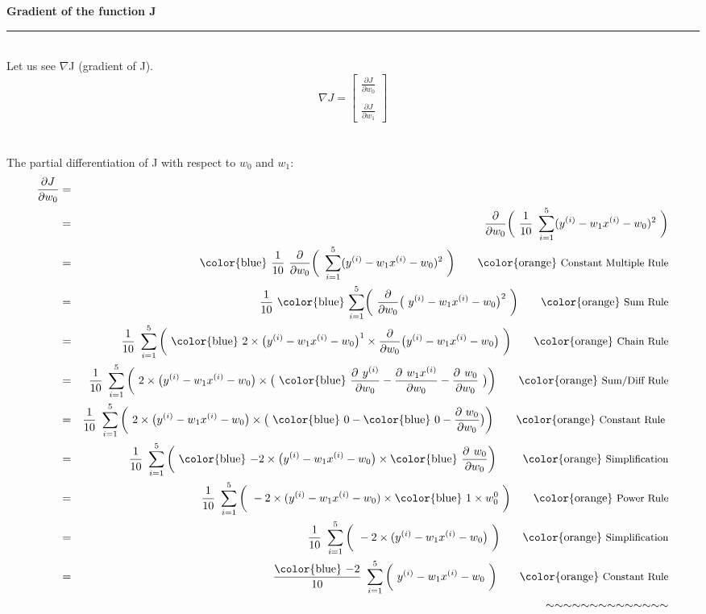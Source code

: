 \documentclass[12pt]{article}
\newcommand{\afmod}[1]{\text{{\color{blue} \textbf{$#1$}}}}
\newcommand{\qtext}[1]{\qquad \text{{\color{orange} \small{#1}}}}
\begin{document}
\break
{\Large \textbf{Gradient of the function J}} \\
\rule{\textwidth}{1pt}
\vspace{3mm} \\
\noindent Let us see $\nabla$J (gradient of J).
\[
\nabla J =
\begin{bmatrix}
    \frac{\partial J}{\partial w_0} \\
\\
    \frac{\partial J}{\partial w_1} 
\end{bmatrix}
\] \\
\vspace{5mm} \\
\noindent The partial differentiation of J with respect to $w_0$ and $w_1$:\\
\begin{eqnarray*}
\frac{\partial J}{\partial w_0} & = &  \\
& = & \frac{\partial}{\partial w_0} \bigg(\ \frac{1}{10} \ \sum_{i=1}^{5} (y^{(i)} - w_1x^{(i)} - w_0)^2\ \bigg) \\
& = & \afmod{\frac{1}{10}} \ \frac{\partial}{\partial w_0} \bigg(\  \sum_{i=1}^{5} (y^{(i)} - w_1x^{(i)} - w_0)^2\ \bigg)
 \qtext{Constant Multiple Rule} \\
& = & \frac{1}{10} \ \afmod{\sum_{i=1}^{5}} \bigg(\ \frac{\partial}{\partial w_0} \big(\ y^{(i)} - w_1x^{(i)} - w_0\big)^2\ \bigg) \qtext{Sum Rule} \\
& = & \frac{1}{10} \ \sum_{i=1}^{5} \bigg(\ \afmod{2 \times \big(y^{(i)} - w_1x^{(i)} - w_0 \big)^1 \times \frac{\partial}{\partial w_0} \big(y^{(i)} - w_1x^{(i)} - w_0 \big)}\ \bigg) \qtext{Chain Rule} \\
& = & \frac{1}{10} \ \sum_{i=1}^{5} \bigg(\ 2 \times \big(y^{(i)}-w_1x^{(i)}-w_0 \big) \times \big(\ \afmod{\frac{\partial\ y^{(i)}}{\partial w_0} - \frac{\partial\ w_1x^{(i)}}{\partial w_0} - \frac{\partial\ w_0}{\partial w_0}} \ \big) \bigg) \qtext{Sum/Diff Rule} \\
& = & \frac{1}{10} \ \sum_{i=1}^{5} \bigg(\ 2 \times \big(y^{(i)} - w_1x^{(i)} - w_0 \big) \times \big(\ \afmod{0} - \afmod{0} - \frac{\partial \ w_0}{\partial w_0} \big) \bigg) \qtext{Constant Rule } \\
& = & \frac{1}{10} \ \sum_{i=1}^{5} \bigg(\ \afmod{-}2 \times \big( y^{(i)} - w_1x^{(i)} - w_0 \big) \times \afmod{\frac{\partial\ w_0}{\partial w_0}}\bigg)\ \qtext{Simplification} \\
& = & \frac{1}{10} \ \sum_{i=1}^{5} \bigg(\ -2 \times (y^{(i)} - w_1x^{(i)} - w_0) \times \afmod{1 \times w_0^0} \ \bigg) \qtext{Power Rule} \\
& = & \frac{1}{10} \ \sum_{i=1}^{5} \bigg(\ -2 \times (y^{(i)} - w_1x^{(i)} - w_0 \big) \ \bigg) \qtext{Simplification} \\
& = & \frac{\afmod{-2}}{10} \ \sum_{i=1}^{5} \bigg( \ y^{(i)} - w_1x^{(i)} - w_0 \ \bigg) \qtext{Constant Rule} \\
& & \quad  \sim \sim \sim \sim \sim \sim \sim \sim \sim \sim \sim \sim \sim \sim
\end{eqnarray*}
\end{document}
